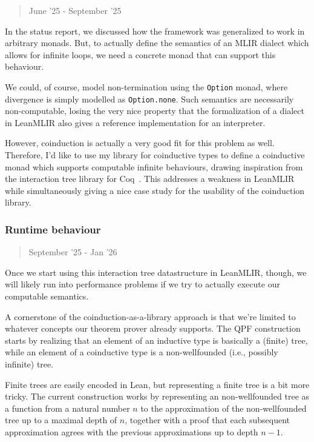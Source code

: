 \documentclass[a4paper]{scrartcl}
\begin{document}
\begin{quote}
June '25 - September  '25
\end{quote}

In the status report, we discussed how the framework was generalized to
work in arbitrary monads. But, to actually define the semantics of an
MLIR dialect which allows for infinite loops, we need a concrete monad
that can support this behaviour.

We could, of course, model non-termination using the \texttt{Option}
monad, where divergence is simply modelled as \texttt{Option.none}. Such
semantics are necessarily non-computable, losing the very nice property
that the formalization of a dialect in LeanMLIR also gives a reference
implementation for an interpreter.

However, coinduction is actually a very good fit for this problem as well.
Therefore, I'd like to use my library for coinductive types to define a
coinductive monad which supports computable infinite behaviours, drawing
inspiration from the interaction tree library for Coq~\cite{xiaInteractionTreesRepresenting2020}.
This addresses a
weakness in LeanMLIR while simultaneously giving a nice case study for
the usability of the coinduction library.

\subsubsection{Runtime behaviour}\label{runtime-behaviour}
\begin{quote}
September '25 - Jan '26
\end{quote}

Once we start using this interaction tree datastructure in LeanMLIR, though, 
we will likely run into performance problems if we try to actually execute our computable semantics.

A cornerstone of the coinduction-as-a-library approach is that we're
limited to whatever concepts our theorem prover already supports. The
QPF construction starts by realizing that an element of an inductive
type is basically a (finite) tree, while an element of a coinductive
type is a non-wellfounded (i.e., possibly infinite) tree.

Finite trees are easily encoded in Lean, but representing a finite tree
is a bit more tricky. The current construction works by representing an
non-wellfounded tree as a function from a natural number \(n\) to the
approximation of the non-wellfounded tree up to a maximal depth of
\(n\), together with a proof that each subsequent approximation agrees
with the previous approximations up to depth \(n-1\).
\end{document}
